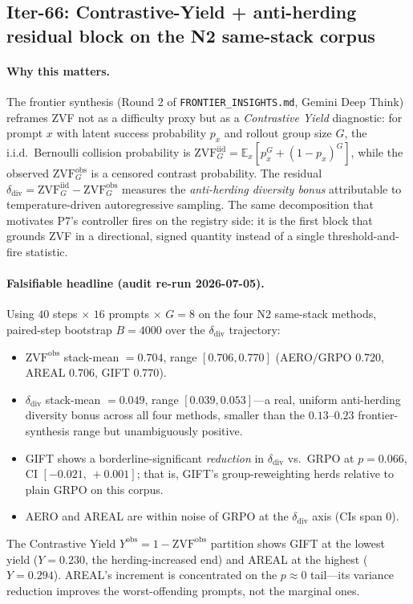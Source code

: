 \subsection{Iter-66: Contrastive-Yield + anti-herding residual block on the N2 same-stack corpus}
\label{sec:p6-zvf-antiherding}

\paragraph{Why this matters.}
The frontier synthesis (Round 2 of \texttt{FRONTIER\_INSIGHTS.md},
Gemini Deep Think) reframes ZVF not as a difficulty proxy but as a
\emph{Contrastive Yield} diagnostic:
for prompt $x$ with latent success probability $p_x$ and rollout
group size $G$, the i.i.d.\ Bernoulli collision probability is
$\mathrm{ZVF}^{\mathrm{iid}}_G = \mathbb{E}_x[p_x^G + (1-p_x)^G]$, while
the observed $\mathrm{ZVF}^{\mathrm{obs}}_G$ is a censored contrast
probability. The residual
$\delta_{\mathrm{div}} = \mathrm{ZVF}^{\mathrm{iid}}_G -
\mathrm{ZVF}^{\mathrm{obs}}_G$ measures the \emph{anti-herding diversity
bonus} attributable to temperature-driven autoregressive sampling. The
same decomposition that motivates P7's controller fires on the registry
side: it is the first block that grounds ZVF in a directional, signed
quantity instead of a single threshold-and-fire statistic.

\paragraph{Falsifiable headline (audit re-run 2026-07-05).}
Using $40$ steps $\times$ $16$ prompts $\times$ $G=8$ on the four
N2 same-stack methods, paired-step bootstrap $B=4000$ over the
$\delta_{\mathrm{div}}$ trajectory:
\begin{itemize}
  \item $\mathrm{ZVF}^{\mathrm{obs}}$ stack-mean $=0.704$, range
        $[0.706, 0.770]$ (AERO/GRPO $0.720$, AREAL $0.706$, GIFT $0.770$).
  \item $\delta_{\mathrm{div}}$ stack-mean $=\mathbf{0.049}$, range
        $[0.039, 0.053]$---a real, uniform anti-herding diversity bonus
        across all four methods, smaller than the $0.13$--$0.23$
        frontier-synthesis range but unambiguously positive.
  \item GIFT shows a borderline-significant \emph{reduction} in
        $\delta_{\mathrm{div}}$ vs.\ GRPO at $p=0.066$, CI
        $[-0.021,\,+0.001]$; that is, GIFT's group-reweighting herds
        relative to plain GRPO on this corpus.
  \item AERO and AREAL are within noise of GRPO at the
        $\delta_{\mathrm{div}}$ axis (CIs span $0$).
\end{itemize}
The Contrastive Yield $Y^{\mathrm{obs}} = 1 - \mathrm{ZVF}^{\mathrm{obs}}$
partition shows GIFT at the lowest yield ($Y=0.230$, the
herding-increased end) and AREAL at the highest ($Y=0.294$). AREAL's
increment is concentrated on the $p\approx 0$ tail---its variance
reduction improves the worst-offending prompts, not the marginal ones.

